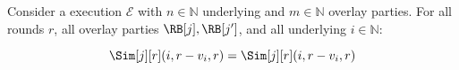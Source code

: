 \begin{conjecture}\label{conj:cross-party}
  Consider a \rollerblade execution $\mathcal{E}$ with $n \in \mathbb{N}$ underlying
  and $m \in \mathbb{N}$ overlay parties.
  For all rounds $r$, all overlay parties $\RB[j], \RB[j']$,
  and all underlying $i \in \mathbb{N}$:

  \[
    \Sim[j][r](i, r - v_i, r) = \Sim[j][r](i, r - v_i, r)
  \]
\end{conjecture}

